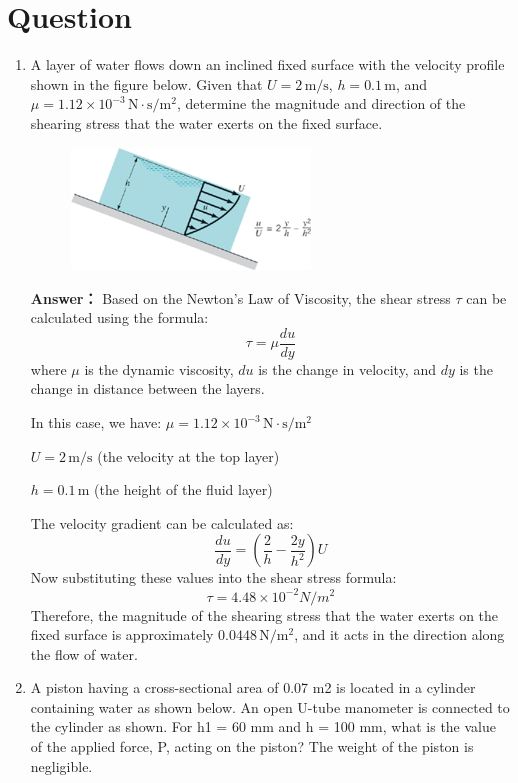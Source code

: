\documentclass[12pt,a4paper]{article}
\newcounter{question}
\newenvironment{questions}{
    \setcounter{question}{0}
    \section*{Question}
    \begin{enumerate}[leftmargin=1.5em,label={\arabic*．}]
}{
    \end{enumerate}
}
\newcommand{\answer}[1]{\par\noindent\textbf{Answer：} #1\par\vspace{1em}}
\begin{document}
\begin{questions}
  \item A layer of water flows down an inclined fixed surface with the velocity profile shown in the figure below. Given that $U = 2\,\mathrm{m/s}$, $h = 0.1\,\mathrm{m}$, and $\mu = 1.12 \times 10^{-3}\,\mathrm{N \cdot s/m^2}$, determine the magnitude and direction of the shearing stress that the water exerts on the fixed surface.

  \begin{figure}[H]
    \centering
    \includegraphics[width=0.6\textwidth]{./figures/1.png}
  \end{figure}

  \answer{
   Based on the Newton's Law of Viscosity, the shear stress $\tau$ can be calculated using the formula:
    \[
    \tau = \mu \frac{du}{dy}
    \]
    where $\mu$ is the dynamic viscosity, $du$ is the change in velocity, and $dy$ is the change in distance between the layers.

    In this case, we have:
     $\mu = 1.12 \times 10^{-3}\,\mathrm{N \cdot s/m^2}$

     $U = 2\,\mathrm{m/s}$ (the velocity at the top layer)

     $h = 0.1\,\mathrm{m}$ (the height of the fluid layer)

    The velocity gradient can be calculated as:
    \[
    \frac{du}{dy} =(\frac{2}{h}-\frac{2y}{h^2})U 
    \]
    Now substituting these values into the shear stress formula:
    \[
    \tau = 4.48 \times 10^{-2} N/m^2
    \]
    Therefore, the magnitude of the shearing stress that the water exerts on the fixed surface is approximately $0.0448\,\mathrm{N/m^2}$, and it acts in the direction along the flow of water. 
  }

  \item A piston having a cross-sectional area of 0.07 m2 is located in a cylinder containing water as shown below. An open U-tube manometer is connected to the cylinder as shown. For h1 = 60 mm and h = 100 mm, what is the value of the applied force, P, acting on the piston? The weight of the piston is negligible. 


\end{questions}
\end{document}
